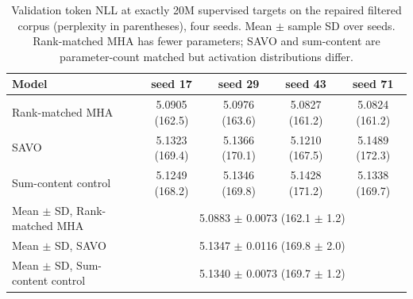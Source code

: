 \begin{table}[t]\centering\caption{Validation token NLL at exactly 20M supervised
targets on the repaired filtered corpus (perplexity in parentheses), four seeds.
Mean $\pm$ sample SD over seeds. Rank-matched MHA has fewer parameters; SAVO and
sum-content are parameter-count matched but activation distributions differ.}
\label{tab:repaired-main}\begin{tabular}{lcccc}\toprule
Model & seed 17 & seed 29 & seed 43 & seed 71 \\ \midrule
Rank-matched MHA & 5.0905 (162.5) & 5.0976 (163.6) & 5.0827 (161.2) & 5.0824 (161.2) \\
SAVO & 5.1323 (169.4) & 5.1366 (170.1) & 5.1210 (167.5) & 5.1489 (172.3) \\
Sum-content control & 5.1249 (168.2) & 5.1346 (169.8) & 5.1428 (171.2) & 5.1338 (169.7) \\
\midrule
Mean $\pm$ SD, Rank-matched MHA & \multicolumn{4}{c}{5.0883 $\pm$ 0.0073 (162.1 $\pm$ 1.2)} \\
Mean $\pm$ SD, SAVO & \multicolumn{4}{c}{5.1347 $\pm$ 0.0116 (169.8 $\pm$ 2.0)} \\
Mean $\pm$ SD, Sum-content control & \multicolumn{4}{c}{5.1340 $\pm$ 0.0073 (169.7 $\pm$ 1.2)} \\
\bottomrule\end{tabular}\end{table}
